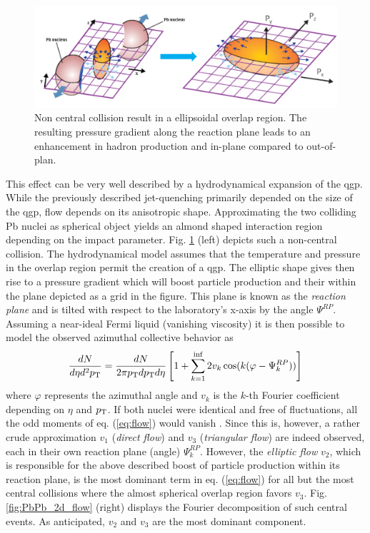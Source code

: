 \begin{figure}
  \centering
  \includegraphics[width=\textwidth]{figures/flow.png}
  \caption[Non central collision result in a ellipsoidal overlap region.]{Non central collision result in a ellipsoidal overlap region. The resulting pressure gradient along the reaction plane leads to an enhancement in hadron production and \pt in-plane compared to out-of-plan.}
  \label{fig:flow_scheme}
\end{figure}


This effect can be very well described by a hydrodynamical expansion of the \gls{qgp}. While the previously described jet-quenching primarily depended on the size of the \gls{qgp}, flow depends on its anisotropic shape. Approximating the two colliding Pb nuclei as spherical object yields an almond shaped interaction region depending on the impact parameter. Fig. \ref{fig:flow_scheme} (left) depicts such a non-central collision. The hydrodynamical model assumes that the temperature and pressure in the overlap region permit the creation of a \gls{qgp}. The elliptic shape gives then rise to a pressure gradient which will boost particle production and their \pt within the plane depicted as a grid in the figure. This plane is known as the \emph{reaction plane} and is tilted with respect to the laboratory's x-axis by the angle $\Psi^{RP}$.  Assuming a near-ideal Fermi liquid (vanishing viscosity) it is then possible to model the observed azimuthal collective behavior as \cite{Wojciech2010}
\begin{equation}
  \label{eq:flow}
  \frac{dN}{d\eta d^2p_{\text{T}}} = 
  \frac{dN}{2\pi p_{\text{T}} dp_{\text{T}} d\eta} 
  \left[ 1+ \sum_{k=1}^{\inf}2v_k \cos (k(\varphi - \Psi_{k}^{RP})) \right ]
\end{equation}
where $\varphi$ represents the azimuthal angle and $v_k$ is the $k$-th Fourier coefficient depending on $\eta$ and $p_{\text{T}}$. If both nuclei were identical and free of fluctuations, all the odd moments of eq. (\ref{eq:flow}) would vanish \cite{Bozek2010}. Since this is, however, a rather crude approximation $v_1$ (\emph{direct flow}) and $v_3$ (\emph{triangular flow}) are indeed observed, each in their own reaction plane (angle) $\Psi_k^{RP}$.  However, the \emph{elliptic flow}  $v_2$, which is responsible for the above described boost of particle production within its reaction plane, is the most dominant term in eq. (\ref{eq:flow}) for all but the most central collisions where the almost spherical overlap region favors $v_3$. Fig. \ref{fig:PbPb_2d_flow} (right) displays the Fourier decomposition of such central events. As anticipated, $v_2$ and $v_3$ are the most dominant component.\\

